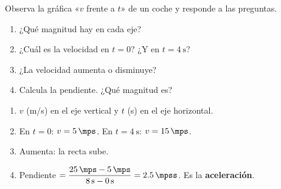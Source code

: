 \begin{exercise}
    Observa la gráfica «\(v\) frente a \(t\)» de un coche y responde a las preguntas.
    \begin{center}
    \end{center}
    \begin{enumerate}[label=\letraminuscula]
        \item ¿Qué magnitud hay en cada eje?
        \item ¿Cuál es la velocidad en \(t = 0\)? ¿Y en \(t = \qty{4}{\s}\)?
        \item ¿La velocidad aumenta o disminuye?
        \item Calcula la pendiente. ¿Qué magnitud es?
    \end{enumerate}
    \begin{solu}
        \begin{enumerate}[label=\alph*)]
            \item \(v\) (m/s) en el eje vertical y \(t\) (s) en el eje horizontal.
            \item En \(t = 0\): \(v = \qty{5}{\mps}\). En \(t = \qty{4}{\s}\): \(v = \qty{15}{\mps}\).
            \item Aumenta: la recta sube.
            \item Pendiente \(= \dfrac{\qty{25}{\mps} - \qty{5}{\mps}}{\qty{8}{\s} - \qty{0}{\s}} = \qty{2.5}{\mpss}\). Es la \textbf{aceleración}.
        \end{enumerate}
    \end{solu}
\end{exercise}

